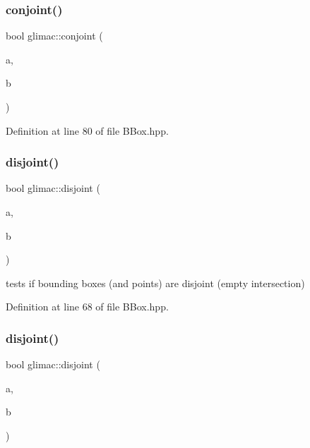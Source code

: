 \subsubsection{\texorpdfstring{conjoint()}{conjoint()}\hspace{0.1cm}{\footnotesize\ttfamily [3/3]}}
{\footnotesize\ttfamily bool glimac\+::conjoint (\begin{DoxyParamCaption}\item[{const \hyperlink{group__core__types_ga1c47e8b3386109bc992b6c48e91b0be7}{glm\+::vec3} \&}]{a,  }\item[{const \hyperlink{structglimac_1_1_b_box3f}{B\+Box3f} \&}]{b }\end{DoxyParamCaption})\hspace{0.3cm}{\ttfamily [inline]}}



Definition at line 80 of file B\+Box.\+hpp.

\mbox{\label{namespaceglimac_af945047660f89612aee39af324b57ab1}} 
\subsubsection{\texorpdfstring{disjoint()}{disjoint()}\hspace{0.1cm}{\footnotesize\ttfamily [1/3]}}
{\footnotesize\ttfamily bool glimac\+::disjoint (\begin{DoxyParamCaption}\item[{const \hyperlink{structglimac_1_1_b_box3f}{B\+Box3f} \&}]{a,  }\item[{const \hyperlink{structglimac_1_1_b_box3f}{B\+Box3f} \&}]{b }\end{DoxyParamCaption})\hspace{0.3cm}{\ttfamily [inline]}}

tests if bounding boxes (and points) are disjoint (empty intersection) 

Definition at line 68 of file B\+Box.\+hpp.

\mbox{\label{namespaceglimac_af23f0fc2accb7aa5ab4ba12018cff335}} 
\subsubsection{\texorpdfstring{disjoint()}{disjoint()}\hspace{0.1cm}{\footnotesize\ttfamily [2/3]}}
{\footnotesize\ttfamily bool glimac\+::disjoint (\begin{DoxyParamCaption}\item[{const \hyperlink{structglimac_1_1_b_box3f}{B\+Box3f} \&}]{a,  }\item[{const \hyperlink{group__core__types_ga1c47e8b3386109bc992b6c48e91b0be7}{glm\+::vec3} \&}]{b }\end{DoxyParamCaption})\hspace{0.3cm}{\ttfamily [inline]}}



